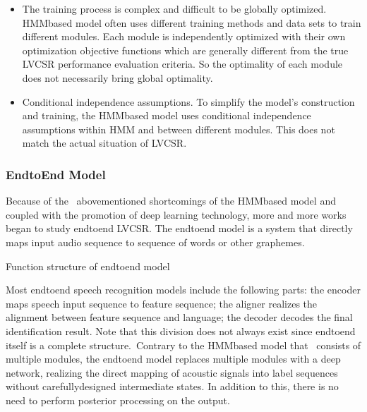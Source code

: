 \documentclass[letterpaper,10pt,english]{jupyterBook}
\begin{document}
\sphinxAtStartPar
{}
\begin{itemize}
\item {} 
\sphinxAtStartPar
The training process is complex and difficult to be globally
optimized. HMM\sphinxhyphen{}based model often uses different training methods and
data sets to train different modules. Each module is independently
optimized with their own optimization objective functions which are
generally different from the true LVCSR performance evaluation
criteria. So the optimality of each module does not necessarily
bring global optimality.

\item {} 
\sphinxAtStartPar
Conditional independence assumptions. To simplify the model’s
construction and training, the HMM\sphinxhyphen{}based model uses conditional
independence assumptions within HMM and between different modules.
This does not match the actual situation of LVCSR.

\end{itemize}


\subsubsection{End\sphinxhyphen{}to\sphinxhyphen{}End Model}
\label{\detokenize{Recognition/Speech_Recognition:end-to-end-model}}
\sphinxAtStartPar
Because of the  above\sphinxhyphen{}mentioned shortcomings of the HMM\sphinxhyphen{}based model and
coupled with the promotion of deep learning technology, more and more
works began to study end\sphinxhyphen{}to\sphinxhyphen{}end LVCSR. The end\sphinxhyphen{}to\sphinxhyphen{}end model is a system
that directly maps input audio sequence to sequence of words or other
graphemes.

\sphinxAtStartPar
{}
Function structure of end\sphinxhyphen{}to\sphinxhyphen{}end model

\sphinxAtStartPar
Most end\sphinxhyphen{}to\sphinxhyphen{}end speech recognition models include the following parts:
the encoder maps speech input sequence to feature sequence; the aligner
realizes the alignment between feature sequence and language; the
decoder decodes the final identification result. Note that this division
does not always exist since end\sphinxhyphen{}to\sphinxhyphen{}end itself is a complete
structure. Contrary to the HMM\sphinxhyphen{}based model that  consists of multiple
modules, the end\sphinxhyphen{}to\sphinxhyphen{}end model replaces multiple modules with a deep
network, realizing the direct mapping of acoustic signals into label
sequences without carefully\sphinxhyphen{}designed intermediate states. In addition to
this, there is no need to perform posterior processing on the output.
\end{document}
